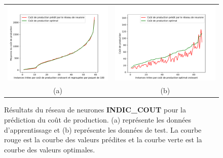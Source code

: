 
\begin{figure}[H]
	\centering
	\begin{tabular}{c c}
		\includegraphics[width=9cm]{images_these/6000_PROD_prediction_reseauALternativeLearning2_train_data.pdf}&
		\includegraphics[width=9cm]{images_these/6000_PROD_prediction_reseauALternativeLearning2_test_data.pdf}
		\\
		(a) & (b)
	\end{tabular}
	\caption[Résultats du réseau de neurones INDIC\_COUT]{Résultats du réseau de neurones \textbf{INDIC\_COUT} pour la prédiction du coût de production. (a) représente les données d'apprentissage et (b) représente les données de test. La courbe rouge est la courbe des valeurs prédites et la courbe verte est la courbe des valeurs optimales.}\label{6000_PROD_prediction_reseauALternativeLearning}
\end{figure}


